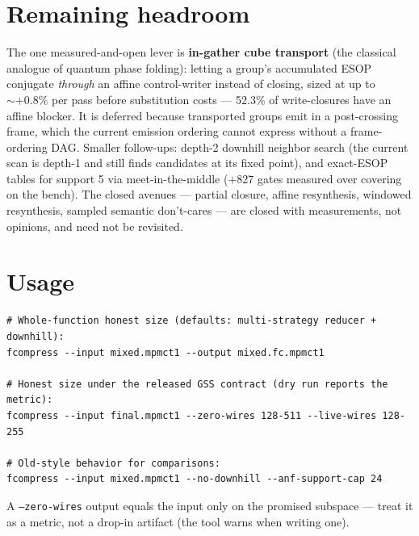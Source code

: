 \documentclass[11pt]{article}
\newcommand{\code}[1]{\texttt{#1}}
\begin{document}
\section{Remaining headroom}

The one measured-and-open lever is \textbf{in-gather cube transport} (the classical analogue of quantum phase folding): letting a group's accumulated ESOP conjugate \emph{through} an affine control-writer instead of closing, sized at up to ${\sim}{+}0.8\%$ per pass before substitution costs --- 52.3\% of write-closures have an affine blocker. It is deferred because transported groups emit in a post-crossing frame, which the current emission ordering cannot express without a frame-ordering DAG. Smaller follow-ups: depth-2 downhill neighbor search (the current scan is depth-1 and still finds candidates at its fixed point), and exact-ESOP tables for support 5 via meet-in-the-middle ($+827$ gates measured over covering on the bench). The closed avenues --- partial closure, affine resynthesis, windowed resynthesis, sampled semantic don't-cares --- are closed with measurements, not opinions, and need not be revisited.

\section{Usage}

\begin{lstlisting}
# Whole-function honest size (defaults: multi-strategy reducer + downhill):
fcompress --input mixed.mpmct1 --output mixed.fc.mpmct1

# Honest size under the released GSS contract (dry run reports the metric):
fcompress --input final.mpmct1 --zero-wires 128-511 --live-wires 128-255

# Old-style behavior for comparisons:
fcompress --input mixed.mpmct1 --no-downhill --anf-support-cap 24
\end{lstlisting}

A \code{--zero-wires} output equals the input only on the promised subspace --- treat it as a metric, not a drop-in artifact (the tool warns when writing one).
\end{document}
